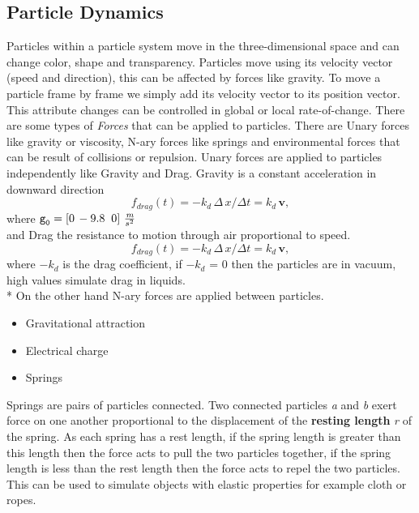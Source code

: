 \subsection{Particle Dynamics}
Particles within a particle system move in the three-dimensional space and can change color, shape and transparency. Particles move using its velocity vector (speed and direction), this can be affected by forces like gravity. To move a particle frame by frame we simply add its velocity vector to its position vector. This attribute changes can be controlled in global or local rate-of-change.
	There are some types of \emph{Forces} that can be applied to particles. There are Unary forces like
gravity or viscosity, N-ary forces like springs and environmental forces that can be result of collisions or repulsion. Unary forces are applied to particles independently like Gravity and Drag. Gravity is a constant acceleration in downward direction 
\begin{equation}
\label{eqn:03}
f_{drag}(t) = -k_{d}\, \Delta\, x / \Delta t = k_{d}\, \textbf{v},
\end{equation}
where $\texttt{g}_{\texttt{0}} = \left [ 0\, -9.8\; \; 0 \right ]\, \frac{\emph{m}}{s^{2}}$
\\
and Drag the resistance to motion through air proportional to speed.
\begin{equation}
\label{eqn:04}
f_{drag}(t) = -k_{d}\, \Delta\, x / \Delta t = k_{d}\, \textbf{v},
\end{equation}
where $-k_{d}$ is the drag coefficient, if $-k_{d}$ = 0 then the particles are in vacuum, high values simulate drag in liquids.\\*
On the other hand N-ary forces are applied between particles.
\begin{itemize}
\item Gravitational attraction  
\item Electrical charge
\item Springs
\end{itemize}
Springs are pairs of particles connected. Two connected particles \emph{a} and \emph{b} exert force on one another proportional to the displacement of the \textbf{resting length} \emph{r} of the spring. As each spring has a rest length, if the spring length is greater than this length then the force acts to pull the two particles together, if the spring length is less than the rest length then the force acts to repel the two particles. This can be used to simulate objects with elastic properties for example cloth or ropes.
